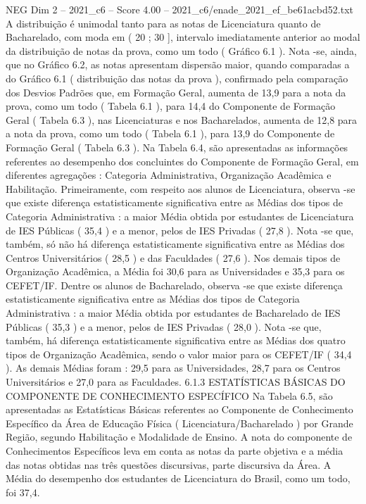 \begin{textsample}{NEG Dim 2 – 2021\_c6 – Score 4.00 – 2021\_c6/enade\_2021\_ef\_be61acbd52.txt}
A distribuição é unimodal tanto para as notas de Licenciatura quanto de Bacharelado, com moda em ( 20 ; 30 ], intervalo imediatamente anterior ao modal da distribuição de notas da prova, como um todo ( Gráfico 6.1 ).
Nota -se, ainda, que no Gráfico 6.2, as notas apresentam dispersão maior, quando comparadas a do Gráfico 6.1 ( distribuição das notas da prova ), confirmado pela comparação dos Desvios Padrões que, em Formação Geral, aumenta de 13,9 para a nota da prova, como um todo ( Tabela 6.1 ), para 14,4 do Componente de Formação Geral ( Tabela 6.3 ), nas Licenciaturas e nos Bacharelados, aumenta de 12,8 para a nota da prova, como um todo ( Tabela 6.1 ), para 13,9 do Componente de Formação Geral ( Tabela 6.3 ).
Na Tabela 6.4, são apresentadas as informações referentes ao desempenho dos concluintes do Componente de Formação Geral, em diferentes agregações : Categoria Administrativa, Organização Acadêmica e Habilitação.
Primeiramente, com respeito aos alunos de Licenciatura, observa -se que existe diferença estatisticamente significativa entre as Médias dos tipos de Categoria Administrativa : a maior Média obtida por estudantes de Licenciatura de IES Públicas ( 35,4 ) e a menor, pelos de IES Privadas ( 27,8 ).
Nota -se que, também, só não há diferença estatisticamente significativa entre as Médias dos Centros Universitários ( 28,5 ) e das Faculdades ( 27,6 ).
Nos demais tipos de Organização Acadêmica, a Média foi 30,6 para as Universidades e 35,3 para os CEFET/IF.
Dentre os alunos de Bacharelado, observa -se que existe diferença estatisticamente significativa entre as Médias dos tipos de Categoria Administrativa : a maior Média obtida por estudantes de Bacharelado de IES Públicas ( 35,3 ) e a menor, pelos de IES Privadas ( 28,0 ).
Nota -se que, também, há diferença estatisticamente significativa entre as Médias dos quatro tipos de Organização Acadêmica, sendo o valor maior para os CEFET/IF ( 34,4 ).
As demais Médias foram : 29,5 para as Universidades, 28,7 para os Centros Universitários e 27,0 para as Faculdades. 6.1.3 ESTATÍSTICAS BÁSICAS DO COMPONENTE DE CONHECIMENTO ESPECÍFICO Na Tabela 6.5, são apresentadas as Estatísticas Básicas referentes ao Componente de Conhecimento Específico da Área de Educação Física ( Licenciatura/Bacharelado ) por Grande Região, segundo Habilitação e Modalidade de Ensino.
A nota do componente de Conhecimentos Específicos leva em conta as notas da parte objetiva e a média das notas obtidas nas três questões discursivas, parte discursiva da Área.
A Média do desempenho dos estudantes de Licenciatura do Brasil, como um todo, foi 37,4.

\end{textsample}
